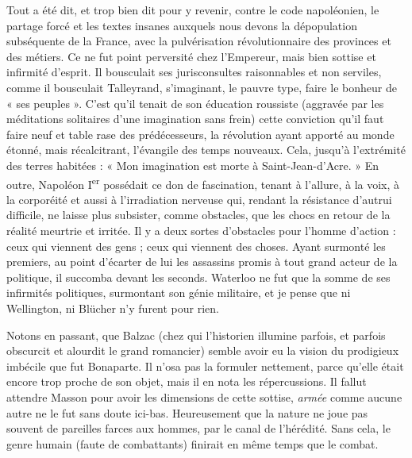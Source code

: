 \documentclass[french,twoside]{book} %
\begin{document}
Tout a été dit, et trop bien dit pour y revenir, contre le code napoléonien, le partage forcé et les textes insanes auxquels nous devons la dépopulation subséquente de la France, avec la pulvérisation révolutionnaire des provinces et des métiers. Ce ne fut point perversité chez l’Empereur, mais bien sottise et infirmité d’esprit. Il bousculait ses jurisconsultes raisonnables et non serviles, comme il bousculait Talleyrand, s’imaginant, le pauvre type, faire le bonheur de « ses peuples ». C’est qu’il tenait de son éducation roussiste (aggravée par les méditations solitaires d’une imagination sans frein) cette conviction qu’il faut faire neuf et table rase des prédécesseurs, la révolution ayant apporté au monde étonné, mais récalcitrant, l’évangile des temps nouveaux. Cela, jusqu’à l’extrémité des terres habitées : « Mon imagination est morte à Saint-Jean-d’Acre. » En outre, Napoléon I\textsuperscript{er} possédait ce don de fascination, tenant à l’allure, à la voix, à la corporéité et aussi à l’irradiation nerveuse qui, rendant la résistance d’autrui difficile, ne laisse plus subsister, comme obstacles, que les chocs en retour de la réalité meurtrie et irritée. Il y a deux sortes d’obstacles pour l’homme d’action : ceux qui viennent des gens ; ceux qui viennent des choses. Ayant surmonté les premiers, au point d’écarter de lui les assassins promis à tout grand acteur de la politique, il succomba devant les seconds. Waterloo ne fut que la somme de ses infirmités politiques, surmontant son génie militaire, et je pense que ni Wellington, ni Blücher n’y furent pour rien.\par
Notons en passant, que Balzac (chez qui l’historien illumine parfois, et parfois obscurcit et alourdit le grand romancier) semble avoir eu la vision du prodigieux imbécile que fut Bonaparte. Il n’osa pas la formuler nettement, parce qu’elle était encore trop proche de son objet, mais il en nota les répercussions. Il fallut attendre Masson pour avoir les dimensions de cette sottise, {\itshape armée} comme aucune autre ne le fut sans doute ici-bas. Heureusement que la nature ne joue pas souvent de pareilles farces aux hommes, par le canal de l’hérédité. Sans cela, le genre humain (faute de combattants) finirait en même temps que le combat.\par
\end{document}

